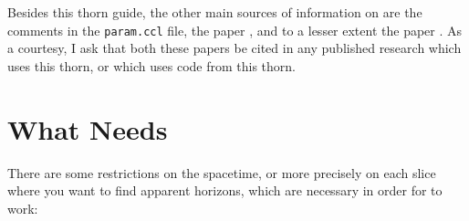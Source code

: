 Besides this thorn guide, the other main sources of information on
 are the comments in the \verb|param.ccl| file,
the paper \cite{AHFinderDirect/Thornburg2003:AH-finding},
and to a lesser extent the paper \cite{AHFinderDirect/Thornburg95}.
As a courtesy, I ask that both these papers be cited in any published
research which uses this thorn, or which uses code from this thorn.


\section{What  Needs}
\label{AHFinderDirect/sect-what-AHFinderDirect-needs}

There are some restrictions on the spacetime, or more precisely
on each slice where you want to find apparent horizons, which are
necessary in order for  to work:
